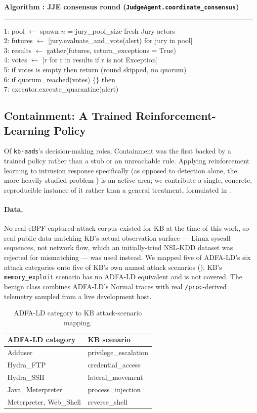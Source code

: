 \documentclass{article}
\newcounter{algo}
\newenvironment{algobox}[1]{%
  \begin{framed}\refstepcounter{algo}\textbf{\sffamily\small Algorithm \thealgo: #1}\vspace{3pt}\hrule\vspace{5pt}
  \small\ttfamily\raggedright
}{%
  \end{framed}
}
\begin{document}
\begin{algobox}{JJE consensus round (\texttt{JudgeAgent.coordinate\_consensus})}
\label{alg:jje}
1: pool $\gets$ spawn $n$ = jury\_pool\_size fresh Jury actors\\
2: futures $\gets$ [jury.evaluate\_and\_vote(alert) for jury in pool]\\
3: results $\gets$ gather(futures, return\_exceptions = True)\\
4: votes $\gets$ [r for r in results if r is not Exception]\\
5: if votes is empty then return \quad(round skipped, no quorum)\\
6: if quorum\_reached(votes) $\{$$\}$ then\\
7: \quad executor.execute\_quarantine(alert)
\end{algobox}

\subsection{Containment: A Trained Reinforcement-Learning Policy}
\label{sec:rl}

Of \texttt{kb-aads}'s decision-making roles, Containment was the first
backed by a trained policy rather than a stub or an unreachable rule.
Applying reinforcement learning to intrusion response specifically (as
opposed to detection alone, the more heavily studied problem
\citep{liao2013intrusion}) is an active area;
we contribute a single, concrete, reproducible instance of it rather
than a general treatment, formulated in .

\paragraph{Data.} No real eBPF-captured attack corpus existed for KB at
the time of this work, so real public data matching KB's actual
observation surface --- Linux syscall sequences, not network flow, which
an initially-tried NSL-KDD dataset was rejected for mismatching --- was
used instead. We mapped five of ADFA-LD's six attack categories
\citep{creech2013generation} onto five of KB's own
named attack scenarios (); KB's
\texttt{memory\_exploit} scenario has no ADFA-LD equivalent and is not
covered. The benign class combines ADFA-LD's Normal traces with real
\texttt{/proc}-derived telemetry sampled from a live development host.

\begin{table}[h]
\centering
\caption{ADFA-LD category to KB attack-scenario mapping.}
\label{tab:mapping}
\begin{tabular}{ll}
\toprule
ADFA-LD category & KB scenario \\
\midrule
Adduser & privilege\_escalation \\
Hydra\_FTP & credential\_access \\
Hydra\_SSH & lateral\_movement \\
Java\_Meterpreter & process\_injection \\
Meterpreter, Web\_Shell & reverse\_shell \\
\bottomrule
\end{tabular}
\end{table}
\end{document}
